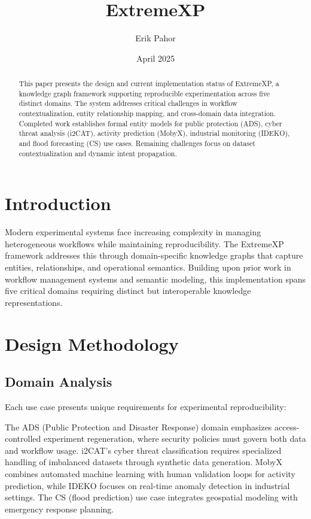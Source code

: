 \documentclass[12pt, a4paper]{article}
\title{ExtremeXP}
\author{Erik Pahor}
\date{April 2025}
\begin{document}
\maketitle

\begin{abstract}
This paper presents the design and current implementation status of ExtremeXP, a knowledge graph framework supporting reproducible experimentation across five distinct domains. The system addresses critical challenges in workflow contextualization, entity relationship mapping, and cross-domain data integration. Completed work establishes formal entity models for public protection (ADS), cyber threat analysis (i2CAT), activity prediction (MobyX), industrial monitoring (IDEKO), and flood forecasting (CS) use cases. Remaining challenges focus on dataset contextualization and dynamic intent propagation.
\end{abstract}

\section{Introduction}
Modern experimental systems face increasing complexity in managing heterogeneous workflows while maintaining reproducibility. The ExtremeXP framework addresses this through domain-specific knowledge graphs that capture entities, relationships, and operational semantics. Building upon prior work in workflow management systems and semantic modeling, this implementation spans five critical domains requiring distinct but interoperable knowledge representations.

\section{Design Methodology}
\subsection{Domain Analysis}
Each use case presents unique requirements for experimental reproducibility:

The ADS (Public Protection and Disaster Response) domain emphasizes access-controlled experiment regeneration, where security policies must govern both data and workflow usage. i2CAT's cyber threat classification requires specialized handling of imbalanced datasets through synthetic data generation. MobyX combines automated machine learning with human validation loops for activity prediction, while IDEKO focuses on real-time anomaly detection in industrial settings. The CS (flood prediction) use case integrates geospatial modeling with emergency response planning.
\end{document}
